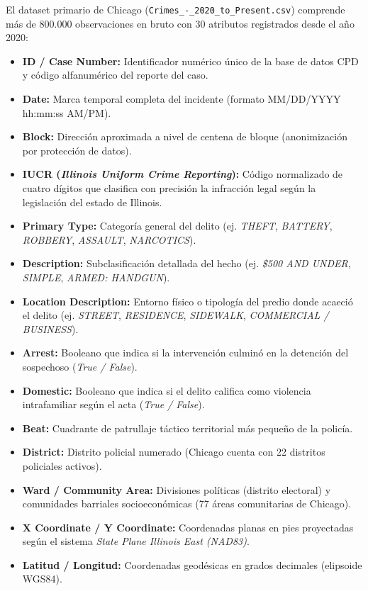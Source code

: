 El dataset primario de Chicago (\texttt{Crimes\_-\_2020\_to\_Present.csv}) comprende más de $800.000$ observaciones en bruto con 30 atributos registrados desde el año 2020:
\begin{itemize}
    \item \textbf{ID / Case Number:} Identificador numérico único de la base de datos CPD y código alfanumérico del reporte del caso.
    \item \textbf{Date:} Marca temporal completa del incidente (formato MM/DD/YYYY hh:mm:ss AM/PM).
    \item \textbf{Block:} Dirección aproximada a nivel de centena de bloque (anonimización por protección de datos).
    \item \textbf{IUCR (\textit{Illinois Uniform Crime Reporting}):} Código normalizado de cuatro dígitos que clasifica con precisión la infracción legal según la legislación del estado de Illinois.
    \item \textbf{Primary Type:} Categoría general del delito (ej. \textit{THEFT}, \textit{BATTERY}, \textit{ROBBERY}, \textit{ASSAULT}, \textit{NARCOTICS}).
    \item \textbf{Description:} Subclasificación detallada del hecho (ej. \textit{\$500 AND UNDER}, \textit{SIMPLE}, \textit{ARMED: HANDGUN}).
    \item \textbf{Location Description:} Entorno físico o tipología del predio donde acaeció el delito (ej. \textit{STREET}, \textit{RESIDENCE}, \textit{SIDEWALK}, \textit{COMMERCIAL / BUSINESS}).
    \item \textbf{Arrest:} Booleano que indica si la intervención culminó en la detención del sospechoso (\textit{True / False}).
    \item \textbf{Domestic:} Booleano que indica si el delito califica como violencia intrafamiliar según el acta (\textit{True / False}).
    \item \textbf{Beat:} Cuadrante de patrullaje táctico territorial más pequeño de la policía.
    \item \textbf{District:} Distrito policial numerado (Chicago cuenta con 22 distritos policiales activos).
    \item \textbf{Ward / Community Area:} Divisiones políticas (distrito electoral) y comunidades barriales socioeconómicas (77 áreas comunitarias de Chicago).
    \item \textbf{X Coordinate / Y Coordinate:} Coordenadas planas en pies proyectadas según el sistema \textit{State Plane Illinois East (NAD83)}.
    \item \textbf{Latitud / Longitud:} Coordenadas geodésicas en grados decimales (elipsoide WGS84).
\end{itemize}

